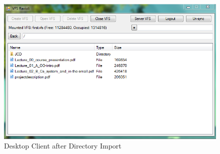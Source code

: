 \documentclass[a4paper,12pt]{article}
\begin{document}
	\begin{figure}[H]
	\centering
	\includegraphics[width=1.00\textwidth]{afterImportApp.png}
	\caption{Desktop Client after Directory Import}
	\label{fig:fullApp}
	\end{figure}
\end{document}
